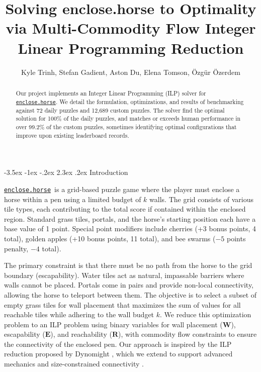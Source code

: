 \documentclass[sigconf,nonacm]{acmart}
\makeatletter
\renewcommand{\section}{\@startsection{section}{1}{\z@}%
  {-3.5ex \@plus -1ex \@minus -.2ex}%
  {2.3ex \@plus.2ex}%
  {\reset@font\Large\bfseries}}
\makeatother
\begin{document}

\title{Solving enclose.horse to Optimality via Multi-Commodity Flow Integer Linear Programming Reduction}

\author{Kyle Trinh, Stefan Gadient, Aston Du, Elena Tomson, Özgür Özerdem}

\newcommand{\horse}{\href{https://enclose.horse}{\texttt{enclose.horse}}}
\newcommand{\level}[1]{\href{https://enclose.horse/play/#1}{{\color{blue}\texttt{#1}}}}

\begin{abstract}
  Our project implements an Integer Linear Programming (ILP) solver for \horse. We detail the formulation, optimizations, and results of benchmarking against 72 daily puzzles and 12,689 custom puzzles. The solver find the optimal solution for 100\% of the daily puzzles, and matches or exceeds human performance in over 99.2\% of the custom puzzles, sometimes identifying optimal configurations that improve upon existing leaderboard records.
\end{abstract}

\maketitle

\section{Introduction}

\horse\ is a grid-based puzzle game where the player must enclose a horse within a pen using a limited budget of $k$ walls. The grid consists of various tile types, each contributing to the total score if contained within the enclosed region. Standard grass tiles, portals, and the horse's starting position each have a base value of 1 point. Special point modifiers include cherries (+3 bonus points, 4 total), golden apples (+10 bonus points, 11 total), and bee swarms ($-5$ points penalty, $-4$ total).

The primary constraint is that there must be no path from the horse to the grid boundary (escapability). Water tiles act as natural, impassable barriers where walls cannot be placed. Portals come in pairs and provide non-local connectivity, allowing the horse to teleport between them. The objective is to select a subset of empty grass tiles for wall placement that maximizes the sum of values for all reachable tiles while adhering to the wall budget $k$. We reduce this optimization problem to an ILP problem using binary variables for wall placement ($\mathbf{W}$), escapability ($\mathbf{E}$), and reachability ($\mathbf{R}$), with commodity flow constraints to ensure the connectivity of the enclosed pen. Our approach is inspired by the ILP reduction proposed by Dynomight \cite{dynomight}, which we extend to support advanced mechanics and size-constrained connectivity \cite{CHEN2016434}.
\end{document}
